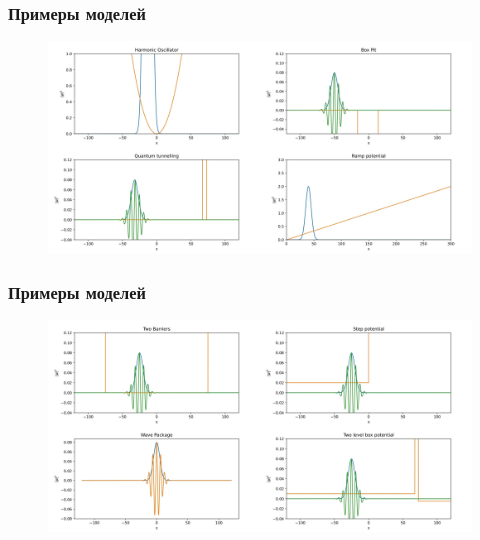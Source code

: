 \documentclass{beamer}
\begin{document}
\begin{frame}
\frametitle{Примеры моделей}

\begin{figure}
    \centering
    \includegraphics[scale=0.25]{images/merged.jpg}
\end{figure}
    
\end{frame}

\begin{frame}
\frametitle{Примеры моделей}

\begin{figure}
    \centering
    \includegraphics[scale=0.25]{images/merged2.jpg}
\end{figure}
    
\end{frame}


  
\end{document}
